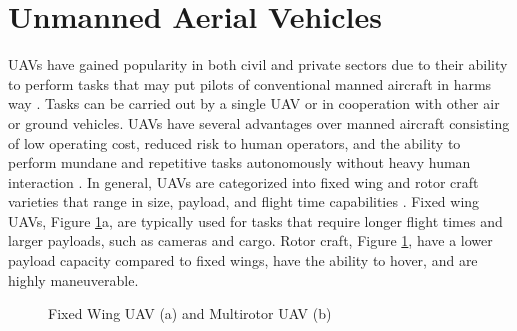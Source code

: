 \documentclass[numbered,pdftex]{ohio-etd}
\begin{document}
\section{Unmanned Aerial Vehicles}
UAVs have gained popularity in both civil and private sectors due to their ability to perform tasks that may put pilots of conventional manned aircraft in harms way \cite{bone_uavs_2003}. Tasks can be carried out by a single UAV or in cooperation with other air \cite{oh_coordinated_2013,hyondong_oh_coordinated_2015,wise_uav_2006} or ground \cite{ulun_coordinated_2013} vehicles. UAVs have several advantages over manned aircraft consisting of low operating cost, reduced risk to human operators, and the ability to perform mundane and repetitive tasks autonomously without heavy human interaction \cite{austin2011unmanned}. In general, UAVs are categorized into fixed wing and rotor craft varieties that range in size, payload, and flight time capabilities \cite{beard_small_2012}. Fixed wing UAVs, Figure \ref{fig:fixedMultirotor}a, are typically used for tasks that require longer flight times and larger payloads, such as cameras and cargo. Rotor craft, Figure \ref{fig:fixedMultirotor}, have a lower payload capacity compared to fixed wings, have the ability to hover, and are highly maneuverable.
\begin{figure}[H]
	\begin{subfigmatrix}{2}%
		\centering	
		\hspace*{0mm}
	\end{subfigmatrix}
	\caption{Fixed Wing UAV (a) and Multirotor UAV (b)}
	\label{fig:fixedMultirotor}
\end{figure}
\end{document}
